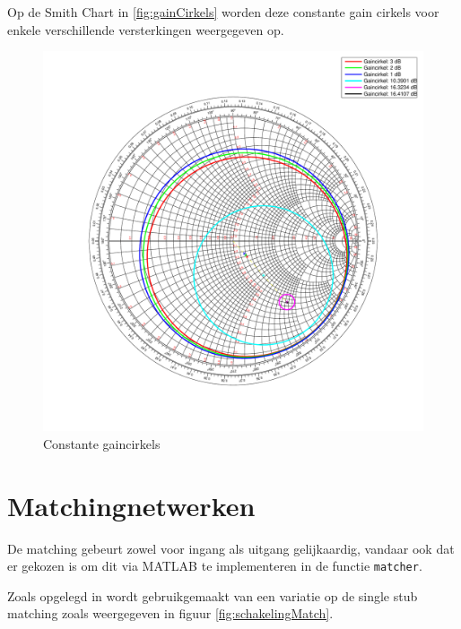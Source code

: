   Op de Smith Chart \cite{smithchart} in \autoref{fig:gainCirkels} worden deze
  constante gain cirkels voor enkele verschillende
  versterkingen weergegeven op.
  \begin{figure}[!h]
      \centering
      \includegraphics[width=\textwidth,keepaspectratio=true]{fig/gaincirkels.pdf}  
      \caption{Constante gaincirkels} 
      \label{fig:gainCirkels}
    \end{figure}
  

\section{Matchingnetwerken}
  De matching gebeurt zowel voor ingang als uitgang gelijkaardig, vandaar ook
  dat er gekozen is om dit via MATLAB te implementeren in de functie \texttt{matcher}.

  Zoals opgelegd in \cite{lesWendy} wordt gebruikgemaakt van een variatie op de
  single stub matching zoals weergegeven in figuur \ref{fig:schakelingMatch}.

